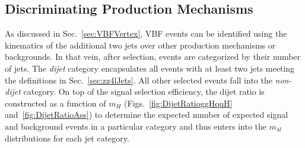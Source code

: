 \subsection{Discriminating Production Mechanisms}
\label{sec:ZZ4lDjet}

As discussed in Sec.~\ref{sec:VBFVertex}, VBF events can be identified using the kinematics of the additional two jets over other production mechanisms or backgrounds. In that vein, after selection, events are categorized by their number of jets. The \textit{dijet} category encapsulates all events with at least two jets meeting the definitions in Sec.~\ref{sec:zz4lJets}. All other selected events fall into the \textit{non-dijet} category. On top of the signal selection efficiency, the dijet ratio is constructed as a function of $m_H$ (Figs.~\ref{fig:DijetRatioggHqqH} and~\ref{fig:DijetRatioAss}) to determine the expected number of expected signal and background events in a particular category and thus enters into the $m_{4l}$ distributions for each jet category.

